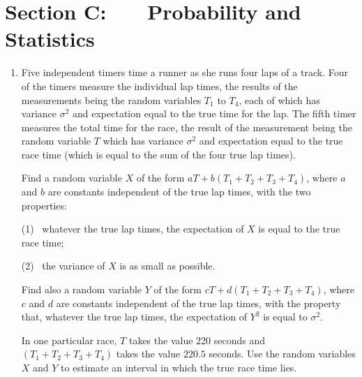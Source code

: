 \documentclass[a4, 11pt]{report}
\newlength{\qspace}
\newcounter{qnumber}
\newenvironment{question}%
 {\vspace{\qspace}
  \begin{enumerate}[\bfseries 1\quad][10]%
    \setcounter{enumi}{\value{qnumber}}%
    \item%
 }
{
  \end{enumerate}
  \filbreak
  \stepcounter{qnumber}
 }
\begin{document}
	
	\newpage
\section*{Section C: \ \ \ Probability and Statistics}


\begin{question}
 Five independent timers time a runner as she runs four laps of a track.
Four of the timers measure the individual lap times, the results of the
measurements being the random variables $T_1$ to
$T_4$, each of which has  variance $\sigma^2$ and 
expectation equal to the true
time for the lap. The fifth timer measures the total time 
for the race, the result of the measurement being the random variable
$T$ which has  variance $\sigma^2$ and
expectation equal to the true race time (which 
is equal to the sum of the four true lap times).
                                
                                                
Find a random variable $X$ of the form $aT+b(T_1+T_2+T_3+T_4)$,
where $a$ and $b$ are constants independent
of the true lap times,
 with
the two properties:

(1) \ whatever the true lap times, the expectation of $X$ is equal to
the true race time;

(2) \ the variance of $X$ is as small as possible.


Find also a random variable $Y$ of the form 
$cT+d(T_1+T_2+T_3+T_4)$, 
where $c$ and $d$ are constants independent
of the true lap times,
 with
the property that, whatever the true lap times, the expectation of $Y^2$ is
equal to $\sigma^2$.

In one particular race, $T$ takes the value 220 seconds and
$(T_1 + T_2 + T_3 + T_4)$ takes the value $220.5$ seconds. Use the random 
variables $X$ and $Y$ to estimate an interval
in which the true race time lies.
\end{question}
\end{document}
